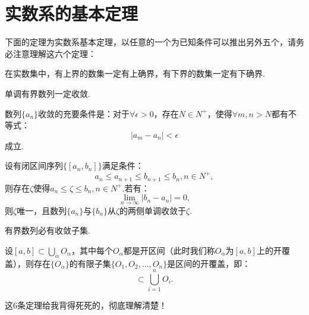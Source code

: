 \section{实数系的基本定理}

下面的定理为实数系基本定理，以任意的一个为已知条件可以推出另外五个，请务必注意理解这六个定理：

\begin{theorem}[确界存在定理]
	在实数集中，有上界的数集一定有上确界，有下界的数集一定有下确界.
\end{theorem}

\begin{theorem}[单调有界定理]
	单调有界数列一定收敛.
\end{theorem}

\begin{theorem}[Cauchy收敛准则]
	数列$\{a_n\}$收敛的充要条件是：对于$\forall\epsilon>0$，存在$N\in N^+$，使得$\forall m,n>N$都有不等式：
	\begin{equation}
		|a_m-a_n|<\epsilon
	\end{equation}
	成立.
\end{theorem}

\begin{theorem}[闭区间套定理]
	设有闭区间序列$\{[a_n,b_n]\}$满足条件：
	\begin{equation}
		a_n\leq a_{n+1}\leq b_{n+1}\leq b_n,n\in N^+,
	\end{equation}
	则存在$\zeta$使得$a_n\leq\zeta\leq b_n,n\in N^+$.若有：
	\begin{equation}
		\displaystyle\lim_{n\to\infty}|b_n-a_n|=0,
	\end{equation}
	则$\zeta$唯一，且数列$\{a_n\}$与$\{b_n\}$从$\zeta$的两侧单调收敛于$\zeta$.
\end{theorem}

\begin{theorem}[聚点定理]
	有界数列必有收敛子集.
\end{theorem}

\begin{theorem}[有限覆盖定理]
	设$[a,b]\subset\displaystyle\bigcup_{\alpha}O_{\alpha}$，其中每个$O_{\alpha}$都是开区间（此时我们称$O_{\alpha}$为$[a,b]$上的开覆盖），则存在$\{O_{\alpha}\}$的有限子集$\{O_1,O_2,\dots,O_n\}$是区间的开覆盖，即：
	\begin{equation}
		[a,b]\subset\displaystyle\bigcup_{i=1}^{n}O_{i}.
	\end{equation}
\end{theorem}

这6条定理给我背得死死的，彻底理解清楚！
